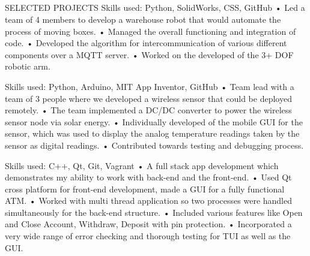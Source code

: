 \documentclass{my_cv}
\begin{document}
\vspace{.05cm}
\begin{multicols}{2}
\section{\faPencil}{SELECTED PROJECTS}
    {Skills used: Python, SolidWorks, CSS, GitHub}%
    {
        • Led a team of 4 members to develop a warehouse robot that would automate the process of moving boxes. \newline
        • Managed the overall functioning and integration of code. \newline
        • Developed the algorithm for intercommunication of various different components over a MQTT server. \newline
        • Worked on the developed of the 3+ DOF robotic arm.
}
    {}

    {Skills used: Python, Arduino, MIT App Inventor, GitHub}%
    {
       • Team lead with a team of 3 people where we developed a wireless sensor that could be deployed remotely. \newline
       • The team implemented a DC/DC converter to power the wireless sensor node via solar energy.\newline
       • Individually developed of the mobile GUI for the sensor, which was used to display the analog temperature readings taken by the sensor as digital readings. \newline
       • Contributed towards testing and debugging process.
}
    {}
    
    {Skills used: C++, Qt, Git, Vagrant}%
    {   
         • A full stack app development which demonstrates my ability to work with back-end and the front-end. \newline
         • Used Qt cross platform for front-end development, made a GUI for a fully functional ATM.
         \newline
         • Worked with multi thread application so two processes were handled simultaneously for the back-end structure. \newline
         • Included various features like Open and Close Account, Withdraw, Deposit with pin protection. \newline
         • Incorporated a very wide range of error checking and thorough testing for TUI as well as the GUI.
    }
    {}
    

\end{multicols}
\end{document}
